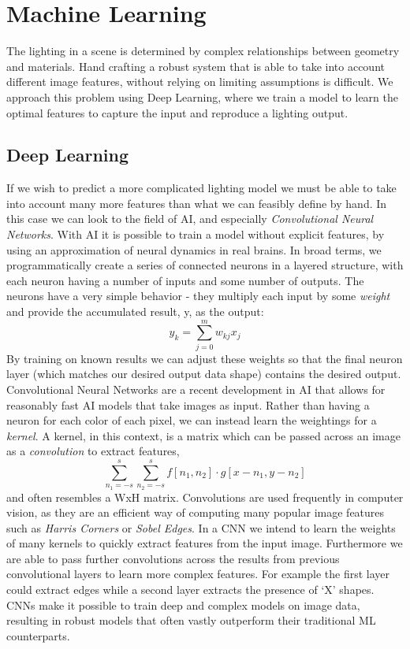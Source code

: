 \documentclass[ %
                    author={Gavin Parker},
                supervisor={Dr. Neill Campbell},
                    degree={MEng},
                     title={Deep Learning for Illumination Estimation from Stereo Images},
                  subtitle={},
                      type={Research},
                      year={2018} ]{dissertation}
\begin{document}
\section{Machine Learning}
The lighting in a scene is determined by complex relationships between geometry and materials. Hand crafting a robust system that is able to take into account different image features, without relying on limiting assumptions is difficult. We approach this problem using Deep Learning, where we train a model to learn the optimal features to capture the input and reproduce a lighting output.
\newline
\subsection{Deep Learning}
If we wish to predict a more complicated lighting model we must be able to take into account many more features than what we can feasibly define by hand. In this case we can look to the field of AI, and especially \textit{Convolutional Neural Networks}. With AI it is possible to train a model without explicit features, by using an approximation of neural dynamics in real brains. In broad terms, we programmatically create a series of connected neurons in a layered structure, with each neuron having a number of inputs and some number of outputs. The neurons have a very simple behavior - they multiply each input by some \textit{weight} and provide the accumulated result, y, as the output:
\[y_k = \sum_{j=0}^{m}{w_{kj}x_j}\]
By training on known results we can adjust these weights so that the final neuron layer (which matches our desired output data shape) contains the desired output.
\newline
Convolutional Neural Networks are a recent development in AI that allows for reasonably fast AI models that take images as input. Rather than having a neuron for each color of each pixel, we can instead learn the weightings for a \textit{kernel}. A kernel, in this context, is a matrix which can be passed across an image as a \textit{convolution} to extract features,
\[\sum_{n_1=-s}^{s}{\sum_{n_2=-s}^{s}{f[n_1, n_2]\cdot g[x-n_1,y-n_2]}} \]
and often resembles a WxH matrix. Convolutions are used frequently in computer vision, as they are an efficient way of computing many popular image features such as \textit{Harris Corners} or \textit{Sobel Edges}. In a CNN we intend to learn the weights of many kernels to quickly extract features from the input image. Furthermore we are able to pass further convolutions across the results from previous convolutional layers to learn more complex features. For example the first layer could extract edges while a second layer extracts the presence of `X' shapes. CNNs make it possible to train deep and complex models on image data, resulting in robust models that often vastly outperform their traditional ML counterparts.
\end{document}
